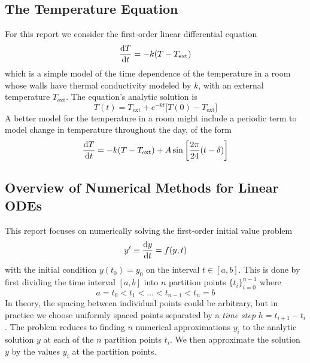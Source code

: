 \documentclass[11pt, a4paper]{article}
\begin{document}
\subsection{The Temperature Equation}
For this report we consider the first-order linear differential equation
\begin{equation}
	\dv{T}{t} = -k(T - T_{\text{ext}}) \label{ivp:eq:dTdt-simple}
\end{equation}
which is a simple model of the time dependence of the temperature in a room whose walls have thermal conductivity modeled by $ k $, with an external temperature $ T_{\text{ext}} $. The equation's analytic solution is 
\begin{equation*}
	T(t) = T_{\text{ext}} + e^{-kt}\big[T(0) - T_{\text{ext}}\big]  \label{ivp:eq:simple-solution}
\end{equation*}
A better model for the temperature in a room might include a periodic term to model change in temperature throughout the day, of the form
\begin{equation}
	\dv{T}{t} = -k(T - T_{\text{ext}}) + A \sin\left[\frac{2\pi}{24}(t - \delta)\right] \label{ivp:eq:dTdt-osc}
\end{equation}

\subsection{Overview of Numerical Methods for Linear ODEs}
This report focuses on numerically solving the first-order initial value problem
\begin{equation*}
	y' \equiv \dv{y}{t} = f(y, t)
\end{equation*}
with the initial condition $ y(t_{0}) = y_{0} $ on the interval $ t \in [a, b] $. This is done by first dividing the time interval $ [a, b] $ into $ n $ partition points $ \{t_{i}\}_{i=0}^{n-1} $ where
\begin{equation*}
	a = t_0 < t_1 < \dots < t_{n-1} < t_{n} = b
\end{equation*}
In theory, the spacing between individual points could be arbitrary, but in practice we choose uniformly spaced points separated by a \textit{time step} $ h = t_{i+1} - t_{i} $. The problem reduces to finding $ n $ numerical approximations $ y_{i} $ to the analytic solution $ y $ at each of the $ n $ partition points $ t_{i} $. We then approximate the solution $ y $ by the values $ y_{i} $ at the partition points.
\end{document}
